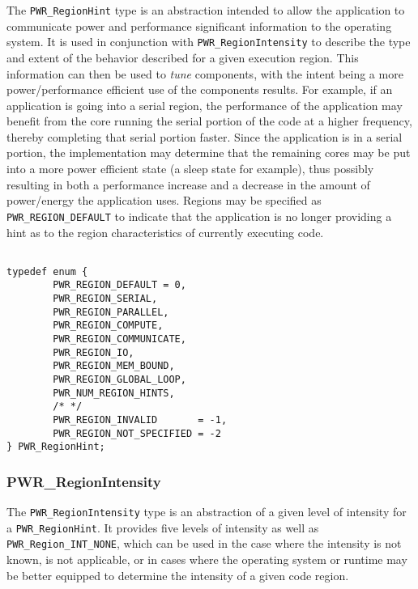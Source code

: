 The  \texttt{PWR_RegionHint} type is an abstraction intended to allow the application to communicate power and performance significant information to the operating system. It is used in conjunction with \texttt{PWR_RegionIntensity} to describe the type and extent of the behavior described for a given execution region. 
This information can then be used to \textit{tune} components, with the intent being a more power/performance efficient use of the components results. 
For example, if an application is going into a serial region, the performance of the application may benefit from the core running the serial portion of the code at a higher frequency, thereby completing that serial portion faster. 
Since the application is in a serial portion, the implementation may determine that the remaining cores may be put into a more power efficient state (a sleep state for example), thus possibly resulting in both a performance increase and a decrease in the amount of power/energy the application uses.
Regions may be specified as \texttt{PWR_REGION_DEFAULT} to indicate that the application is no longer providing a hint as to the region characteristics of currently executing code.

\begin{center}
\begin{minipage}{.95\linewidth}%
\begin{lstlisting}

typedef enum {
        PWR_REGION_DEFAULT = 0,
        PWR_REGION_SERIAL,
        PWR_REGION_PARALLEL,
        PWR_REGION_COMPUTE,
        PWR_REGION_COMMUNICATE,
        PWR_REGION_IO,
        PWR_REGION_MEM_BOUND,
        PWR_REGION_GLOBAL_LOOP,
        PWR_NUM_REGION_HINTS,
        /* */
        PWR_REGION_INVALID       = -1,
        PWR_REGION_NOT_SPECIFIED = -2
} PWR_RegionHint;

\end{lstlisting}
\end{minipage}
\end{center}


\subsubsection{PWR_RegionIntensity}\label{type:RegionIntensity}

The \texttt{PWR_RegionIntensity} type is an abstraction of a given level of intensity for a \texttt{PWR_RegionHint}.
It provides five levels of intensity as well as \texttt{PWR_Region_INT_NONE}, which can be used in the case where
the intensity is not known, is not applicable, or in cases where the operating system or runtime may be better
equipped to determine the intensity of a given code region.

